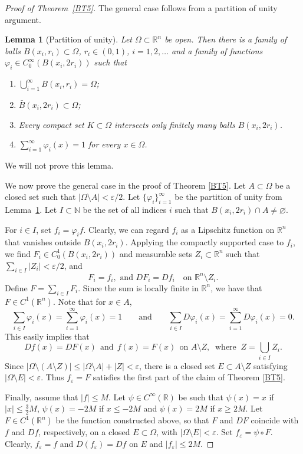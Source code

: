 \documentclass[10pt,a4paper]{amsart}
\newtheorem{lemma}{Lemma}
\newcommand{\bbbn}{\mathbb N}
\newcommand{\bbbr}{\mathbb R}
\newcommand{\eps}{\varepsilon}
\begin{document}
\begin{proof}[Proof of Theorem~\ref{BT5}]
The general case follows from a partition of unity argument.
\begin{lemma}[Partition of unity]
\label{WT1-T3}
Let $\Omega\subset\bbbr^n$ be open. Then there is a family of balls $B(x_i,r_i)\subset\Omega$, $r_i\in (0,1)$,
$i=1,2,\ldots$ and a family of functions $\varphi_i\in C_0^\infty(B(x_i,2r_i))$ such that
\begin{enumerate}
\item
$\bigcup_{i=1}^\infty B(x_i,r_i)=\Omega$;
\item
$\bar{B}(x_i,2r_i)\subset\Omega$;
\item
Every compact set $K\subset\Omega$ intersects only finitely many balls $B(x_i,2r_i)$.
\item
$
\sum_{i=1}^\infty \varphi_i(x)=1
$
for every $x\in\Omega$.
\end{enumerate}
\end{lemma}
We will not prove this lemma.

We now prove the general case in the proof of Theorem \ref{BT5}. Let $A\subset \Omega$ be a closed set such that
$|\Omega\setminus A|<\eps/2$.
Let $\{\varphi_i\}_{i=1}^{\infty}$ be the partition of unity from Lemma~\ref{WT1-T3}.
Let $I\subset\bbbn$ be the set of all indices $i$ such that $B(x_i,2r_i)\cap A\neq\varnothing$.

For $i\in I$, set $f_i=\varphi_i f$. Clearly, we can regard $f_i$ as a
Lipschitz function on $\mathbb R^n$ that vanishes outside $B(x_i,2r_i)$. Applying the compactly supported case to
$f_i$, we find $F_i\in C^1_0(B(x_i,2r_i))$ and measurable sets
$Z_i\subset \mathbb R^n$ such that
$\sum_{i\in I}|Z_i|<\eps/2$, and
\[
F_i=f_i, \text{ and } DF_i=Df_i
\quad\text{on } \mathbb R^n\setminus Z_i .
\]
Define $F=\sum_{i\in I}F_i$.
Since the sum is locally finite in $\mathbb R^n$, we have that $F\in C^1(\mathbb R^n)$.
Note that for $x\in A$,
$$
\sum_{i\in I}\varphi_i(x)= \sum_{i=1}^\infty\varphi_i(x)=1
\qquad
\text{and}
\qquad
\sum_{i\in I}D\varphi_i(x)= \sum_{i=1}^\infty D\varphi_i(x)=0.
$$
This easily implies that
$$
Df(x)=DF(x) \ \ \text{and}\ \ f(x)=F(x)
\ \
\text{on } A\setminus Z, \ \text{ where } \ Z=\bigcup_{i\in I} Z_i.
$$
Since $|\Omega\setminus(A\setminus Z)|\leq |\Omega\setminus A|+|Z|<\eps$, there is a closed set $E\subset A\setminus Z$ satisfying $|\Omega\setminus E|<\eps$. Thus $f_\eps=F$ satisfies the first part of the claim of Theorem \ref{BT5}.

Finally, assume that $|f|\leq M$. Let $\psi\in C^\infty(\bbbr)$ be such that $\psi(x)=x$ if $|x|\leq \tfrac{3}{2}M$, $\psi(x)=-2M$ if $x\leq -2M$ and $\psi(x)=2M$ if $x\geq 2M$. Let $F\in C^1(\bbbr^n)$ be the function constructed above, so that $F$ and $DF$ coincide with $f$ and $Df$, respectively, on a closed $E\subset \Omega$, with $|\Omega\setminus E|<\eps$. Set $f_\eps=\psi\circ F$. Clearly, $f_\eps=f$ and $D(f_\eps)=Df$ on $E$ and $|f_\eps|\leq 2M$.
\end{proof}
\end{document}

